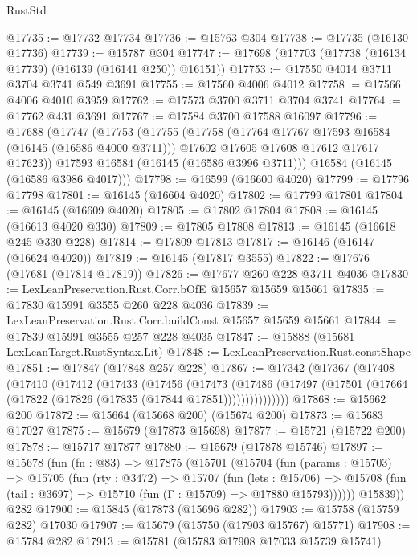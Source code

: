 \begin{lexlean}{RustStd}
\begin{coremodule}
{\begin{coremodule}
{{{{{{{{{{{{{{{{{{{{{{{{{{{{{{{{{{{{{{{{{{{{{{{@17735 := @17732 @17734
@17736 := @15763 @304
@17738 := @17735 (@16130 @17736)
@17739 := @15787 @304
@17747 := @17698 (@17703 (@17738 (@16134 @17739) (@16139 (@16141 @250)) @16151))
@17753 := @17550 @4014 @3711 @3704 @3741 @549 @3691
@17755 := @17560 @4006 @4012
@17758 := @17566 @4006 @4010 @3959
@17762 := @17573 @3700 @3711 @3704 @3741
@17764 := @17762 @431 @3691
@17767 := @17584 @3700 @17588 @16097
@17796 := @17688
    (@17747
      (@17753
        (@17755
          (@17758
            (@17764 @17767 @17593 @16584 (@16145 (@16586 @4000 @3711)))
            @17602
            @17605
            @17608
            @17612
            @17617
            @17623))
        @17593
        @16584
        (@16145 (@16586 @3996 @3711)))
      @16584
      (@16145 (@16586 @3986 @4017)))
@17798 := @16599 (@16600 @4020)
@17799 := @17796 @17798
@17801 := @16145 (@16604 @4020)
@17802 := @17799 @17801
@17804 := @16145 (@16609 @4020)
@17805 := @17802 @17804
@17808 := @16145 (@16613 @4020 @330)
@17809 := @17805 @17808
@17813 := @16145 (@16618 @245 @330 @228)
@17814 := @17809 @17813
@17817 := @16146 (@16147 (@16624 @4020))
@17819 := @16145 (@17817 @3555)
@17822 := @17676 (@17681 (@17814 @17819))
@17826 := @17677 @260 @228 @3711 @4036
@17830 := LexLeanPreservation.Rust.Corr.bOfE @15657 @15659 @15661
@17835 := @17830 @15991 @3555 @260 @228 @4036
@17839 := LexLeanPreservation.Rust.Corr.buildConst @15657 @15659 @15661
@17844 := @17839 @15991 @3555 @257 @228 @4035
@17847 := @15888 (@15681 LexLeanTarget.RustSyntax.Lit)
@17848 := LexLeanPreservation.Rust.constShape
@17851 := @17847 (@17848 @257 @228)
@17867 := @17342
    (@17367
      (@17408
        (@17410
          (@17412
            (@17433
              (@17456
                (@17473
                  (@17486
                    (@17497 (@17501 (@17664 (@17822 (@17826 (@17835 (@17844 @17851)))))))))))))))
@17868 := @15662 @200
@17872 := @15664 (@15668 @200) (@15674 @200)
@17873 := @15683 @17027
@17875 := @15679 (@17873 @15698)
@17877 := @15721 (@15722 @200)
@17878 := @15717 @17877
@17880 := @15679 (@17878 @15746)
@17897 := @15678
    (fun (fn : @83) =>
    @17875
      (@15701
        (@15704
          (fun (params : @15703) =>
          @15705
            (fun (rty : @3472) =>
            @15707
              (fun (lets : @15706) =>
              @15708 (fun (tail : @3697) => @15710 (fun (Γ : @15709) => @17880 @15793))))))
        @15839))
    @282
@17900 := @15845 (@17873 (@15696 @282))
@17903 := @15758 (@15759 @282) @17030
@17907 := @15679 (@15750 (@17903 @15767) @15771)
@17908 := @15784 @282
@17913 := @15781 (@15783 @17908 @17033 @15739 @15741)
}}}}}}}}}}}}}}}}}}}}}}}}}}}}}}}}}}}}}}}}}}}}}}}
\end{coremodule}}
\end{coremodule}
\end{lexlean}

